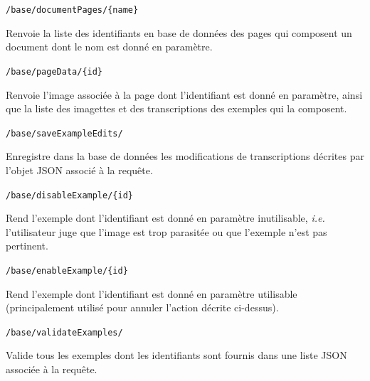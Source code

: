 \item [Annotation / Validation]

\item [GET] \texttt{/base/documentPages/\{name\}}\newline{}
\begin{itshape}
Renvoie la liste des identifiants en base de données des pages qui composent un document dont le nom est donné en paramètre.
\end{itshape}

\item [GET] \texttt{/base/pageData/\{id\}}\newline{}
\begin{itshape}
Renvoie l'image associée à la page dont l'identifiant est donné en paramètre, ainsi que la liste des imagettes et des transcriptions des exemples qui la composent.
\end{itshape}

\item [POST] \texttt{/base/saveExampleEdits/}\newline{}
\begin{itshape}
Enregistre dans la base de données les modifications de transcriptions décrites par l'objet JSON associé à la requête.
\end{itshape}

\item [PUT] \texttt{/base/disableExample/\{id\}}\newline{}
\begin{itshape}
Rend l'exemple dont l'identifiant est donné en paramètre inutilisable, \textit{i.e.} l'utilisateur juge que l'image est trop parasitée ou que l'exemple n'est pas pertinent.
\end{itshape}

\item [PUT] \texttt{/base/enableExample/\{id\}}\newline{}
\begin{itshape}
Rend l'exemple dont l'identifiant est donné en paramètre utilisable (principalement utilisé pour annuler l'action décrite ci-dessus).
\end{itshape}

\item [POST] \texttt{/base/validateExamples/}\newline{}
\begin{itshape}
Valide tous les exemples dont les identifiants sont fournis dans une liste JSON associée à la requête.
\end{itshape}


